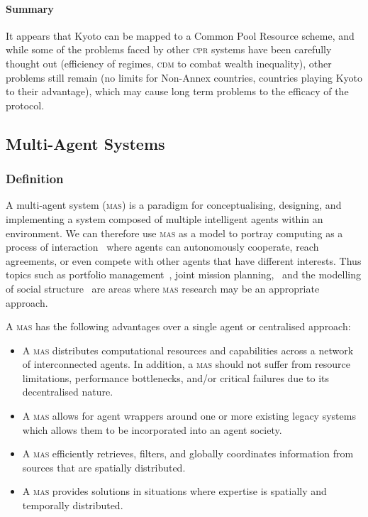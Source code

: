 \paragraph{Summary} It appears that Kyoto can be mapped to a Common Pool Resource scheme, and while some of the problems faced by other \textsc{cpr} systems have been carefully thought out (efficiency of regimes, \textsc{cdm} to combat wealth inequality), other problems still remain (no limits for Non-Annex countries, countries playing Kyoto to their advantage), which may cause long term problems to the efficacy of the protocol.

\subsection{Multi-Agent Systems}

\subsubsection{Definition}

A multi-agent system (\textsc{mas}) is a paradigm for conceptualising, designing, and implementing a system composed of multiple intelligent agents within an environment. We can therefore use \textsc{mas} as a model to portray computing as a process of interaction~\cite{MAS-DoC} where agents can autonomously cooperate, reach agreements, or even compete with other agents that have different interests.  Thus topics such as portfolio management~\cite{Warren-ISA}, joint mission planning,~\cite{Joccasta-ISA} and the modelling of social structure~\cite{jasss-soc-surrey} are areas where \textsc{mas} research may be an appropriate approach.

A \textsc{mas} has the following advantages over a single agent or centralised approach:

\begin{itemize}
	\item A \textsc{mas} distributes computational resources and capabilities across a network of interconnected agents. In addition, a \textsc{mas} should not suffer from resource limitations, performance bottlenecks, and/or critical failures due to its decentralised nature.

	\item A \textsc{mas} allows for agent wrappers around one or more existing legacy systems which allows them to be incorporated into an agent society.

	\item A \textsc{mas} efficiently retrieves, filters, and globally coordinates information from sources that are spatially distributed.

	\item A \textsc{mas} provides solutions in situations where expertise is spatially and temporally distributed.
\end{itemize}


